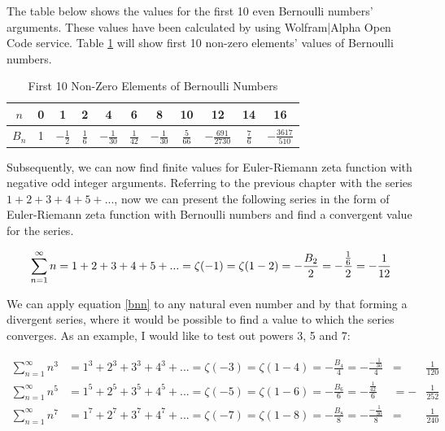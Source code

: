 \documentclass[a4paper]{article}
\begin{document}
The table below shows the values for the first 10 even Bernoulli numbers' arguments. These values
have been calculated by using Wolfram|Alpha Open Code service. Table \ref{tab:bernoulli} will show
first 10 non-zero elements' values of Bernoulli numbers.

\begin{table}[h!]
  \begin{center}
    \begin{tabular}{c | c | c | c | c | c | c | c | c | c | c}
      $n$ & 0 & 1 & 2 & 4 & 6 & 8 & 10 & 12 & 14 & 16\\
      \hline
      $B_n$ & 1 & $-\frac{1}{2}$ & $\frac{1}{6}$ & $-\frac{1}{30}$
      & $\frac{1}{42}$ & $-\frac{1}{30}$ & $\frac{5}{66}$ & $-\frac{691}{2730}$
      & $\frac{7}{6}$ & $-\frac{3617}{510}$\\
    \end{tabular}
    \caption{First 10 Non-Zero Elements of Bernoulli Numbers}
    \label{tab:bernoulli}
  \end{center}
 \end{table}

Subsequently, we can now find finite values for Euler-Riemann zeta function with negative odd
integer arguments. Referring to the previous chapter with the series $1+2+3+4+5+...$, now
we can present the following series in the form of Euler-Riemann zeta function with Bernoulli
numbers and find a convergent value for the series.

\begin{equation}
  \sum_{n=1}^{\infty} n = 1+2+3+4+5+...=\zeta(-1)=\zeta(1-2)=-\frac{B_2}{2}=
  -\frac{\frac{1}{6}}{2}=-\frac{1}{12}\\
  \end{equation}

We can apply equation \ref{bnn} to any natural even number and by that forming a divergent series,
where it would be possible to find a value to which the series converges. As an example, I would like
to test out powers 3, 5 and 7:

\begin{align*}
  \sum_{n=1}^{\infty}n^3&=1^3+2^3+3^3+4^3+...=\zeta(-3)=\zeta(1-4)=
  -\frac{B_4}{4}=-\frac{-\frac{1}{30}}{4}&=&\frac{1}{120}\\
  \sum_{n=1}^{\infty}n^5&=1^5+2^5+3^5+4^5+...=\zeta(-5)=\zeta(1-6)=
  -\frac{B_6}{6}=-\frac{\frac{1}{42}}{6}&=-&\frac{1}{252}\\
  \sum_{n=1}^{\infty}n^7&=1^7+2^7+3^7+4^7+...=\zeta(-7)=\zeta(1-8)=
  -\frac{B_8}{8}=-\frac{-\frac{1}{30}}{8}&=&\frac{1}{240}\\
\end{align*}
\end{document}
